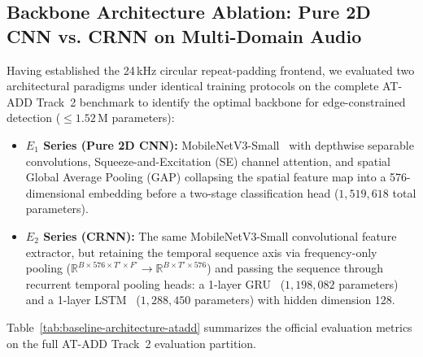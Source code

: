 \subsection{Backbone Architecture Ablation: Pure 2D CNN vs. CRNN on Multi-Domain Audio}
\label{subsec:baseline-arch-ablation}

Having established the 24\,kHz circular repeat-padding frontend, we evaluated two architectural paradigms under identical training protocols on the complete AT-ADD Track~2 benchmark to identify the optimal backbone for edge-constrained detection ($\le 1.52\,\text{M}$ parameters):
\begin{itemize}
  \item \textbf{$E_1$ Series (Pure 2D CNN):} MobileNetV3-Small~\cite{howard2019mobilenetv3} with depthwise separable convolutions, Squeeze-and-Excitation (SE) channel attention, and spatial Global Average Pooling (GAP) collapsing the spatial feature map into a 576-dimensional embedding before a two-stage classification head ($1{,}519{,}618$ total parameters).
  \item \textbf{$E_2$ Series (CRNN):} The same MobileNetV3-Small convolutional feature extractor, but retaining the temporal sequence axis via frequency-only pooling ($\mathbb{R}^{B \times 576 \times T' \times F'} \to \mathbb{R}^{B \times T' \times 576}$) and passing the sequence through recurrent temporal pooling heads: a 1-layer GRU~\cite{gomez2019light} ($1{,}198{,}082$ parameters) and a 1-layer LSTM~\cite{chintha2020crnn} ($1{,}288{,}450$ parameters) with hidden dimension 128.
\end{itemize}

Table~\ref{tab:baseline-architecture-atadd} summarizes the official evaluation metrics on the full AT-ADD Track~2 evaluation partition.

\begin{table}[htbp]
\centering
\caption{Baseline architecture comparison on full AT-ADD Track~2 evaluation partition.}
\label{tab:baseline-architecture-atadd}
\vspace{0.15cm}
\end{table}

